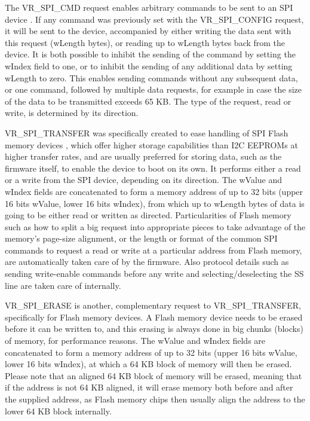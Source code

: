 \documentclass[a4paper,12pt]{report}
\begin{document}
The VR\_SPI\_CMD request enables arbitrary commands to be sent to an SPI device \cite{TN1222}. If any command was previously set with the VR\_SPI\_CONFIG request, it will be sent to the device, accompanied by either writing the data sent with this request (wLength bytes), or reading up to wLength bytes back from the device. It is both possible to inhibit the sending of the command by setting the wIndex field to one, or to inhibit the sending of any additional data by setting wLength to zero. This enables sending commands without any subsequent data, or one command, followed by multiple data requests, for example in case the size of the data to be transmitted exceeds 65 KB. The type of the request, read or write, is determined by its direction.

VR\_SPI\_TRANSFER was specifically created to ease handling of SPI Flash memory devices \cite{W25Q80BW}, which offer higher storage capabilities than I2C EEPROMs at higher transfer rates, and are usually preferred for storing data, such as the firmware itself, to enable the device to boot on its own.
It performs either a read or a write from the SPI device, depending on its direction. The wValue and wIndex fields are concatenated to form a memory address of up to 32 bits (upper 16 bits wValue, lower 16 bits wIndex), from which up to wLength bytes of data is going to be either read or written as directed. Particularities of Flash memory such as how to split a big request into appropriate pieces to take advantage of the memory's page-size alignment, or the length or format of the common SPI commands to request a read or write at a particular address from Flash memory, are automatically taken care of by the firmware. Also protocol details such as sending write-enable commands before any write and selecting/deselecting the SS line are taken care of internally.

VR\_SPI\_ERASE is another, complementary request to VR\_SPI\_TRANSFER, specifically for Flash memory devices. A Flash memory device needs to be erased before it can be written to, and this erasing is always done in big chunks (blocks) of memory, for performance reasons. The wValue and wIndex fields are concatenated to form a memory address of up to 32 bits (upper 16 bits wValue, lower 16 bits wIndex), at which a 64 KB block of memory will then be erased. Please note that an aligned 64 KB block of memory will be erased, meaning that if the address is not 64 KB aligned, it will erase memory both before and after the supplied address, as Flash memory chips then usually align the address to the lower 64 KB block internally.
\end{document}
